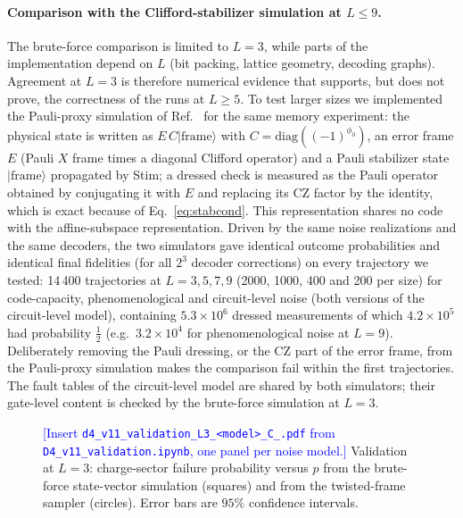\documentclass[a4paper]{article}
\newcommand{\blue}[1]{\textcolor{blue}{#1}}
\providecommand{\ket}[1]{\ensuremath{|#1\rangle}}
\begin{document}
\paragraph{Comparison with the Clifford-stabilizer simulation at $L\le9$.}
The brute-force comparison is limited to $L=3$, while parts of the implementation depend on $L$ (bit packing, lattice geometry, decoding graphs). Agreement at $L=3$ is therefore numerical evidence that supports, but does not prove, the correctness of the runs at $L\ge5$. To test larger sizes we implemented the Pauli-proxy simulation of Ref.~\cite{takada2026exact} for the same memory experiment: the physical state is written as $E\,C\ket{\mathrm{frame}}$ with $C=\mathrm{diag}((-1)^{\phi_0})$, an error frame $E$ (Pauli $X$ frame times a diagonal Clifford operator) and a Pauli stabilizer state $\ket{\mathrm{frame}}$ propagated by Stim; a dressed check is measured as the Pauli operator obtained by conjugating it with $E$ and replacing its CZ factor by the identity, which is exact because of Eq.~\eqref{eq:stabcond}. This representation shares no code with the affine-subspace representation. Driven by the same noise realizations and the same decoders, the two simulators gave identical outcome probabilities and identical final fidelities (for all $2^3$ decoder corrections) on every trajectory we tested: 14\,400 trajectories at $L=3,5,7,9$ (2000, 1000, 400 and 200 per size) for code-capacity, phenomenological and circuit-level noise (both versions of the circuit-level model), containing $5.3\times10^6$ dressed measurements of which $4.2\times10^5$ had probability $\tfrac12$ (e.g.\ $3.2\times10^4$ for phenomenological noise at $L=9$). Deliberately removing the Pauli dressing, or the CZ part of the error frame, from the Pauli-proxy simulation makes the comparison fail within the first trajectories. The fault tables of the circuit-level model are shared by both simulators; their gate-level content is checked by the brute-force simulation at $L=3$.

\begin{figure}[t]
  \centering
  \fbox{\rule{0pt}{50mm}\rule{0.82\linewidth}{0pt}}
  \caption{\blue{[Insert \texttt{d4\_v11\_validation\_L3\_<model>\_C\_<r|rgb>.pdf} from \texttt{D4\_v11\_validation.ipynb}, one panel per noise model.]} Validation at $L=3$: charge-sector failure probability versus $p$ from the brute-force state-vector simulation (squares) and from the twisted-frame sampler (circles). Error bars are $95\%$ confidence intervals.}
  \label{fig:validation}
\end{figure}
\end{document}
